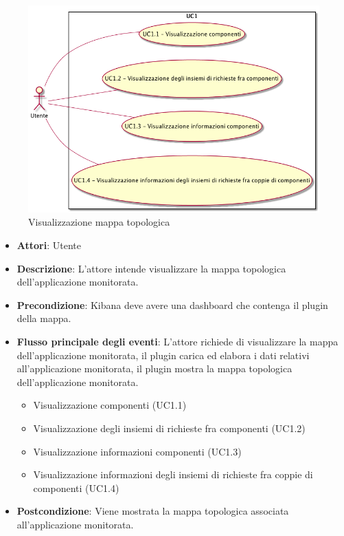 \begin{figure} [H]
\centering
\includegraphics[scale=0.45]{./UC/UC1.png}
\caption{Visualizzazione mappa topologica}\label{}
\end{figure}
\begin{itemize}
\item \textbf{Attori}: Utente
\item \textbf{Descrizione}: L'attore intende visualizzare la mappa topologica dell'applicazione monitorata.
\item \textbf{Precondizione}: Kibana deve avere una dashboard che contenga il plugin della mappa.
\item \textbf{Flusso principale degli eventi}: L'attore richiede di visualizzare la mappa dell'applicazione monitorata, il plugin carica ed elabora i dati relativi all'applicazione monitorata, il plugin mostra la mappa topologica dell'applicazione monitorata.
\begin{itemize}
\item Visualizzazione componenti (UC1.1)
\item Visualizzazione degli insiemi di richieste fra componenti (UC1.2)
\item Visualizzazione informazioni componenti (UC1.3)
\item Visualizzazione informazioni degli insiemi di richieste fra coppie di componenti (UC1.4)
\end{itemize}
\item \textbf{Postcondizione}: Viene mostrata la mappa topologica associata all'applicazione monitorata.
\end{itemize}
